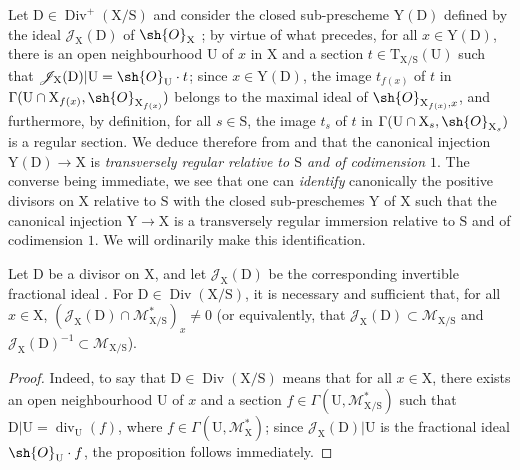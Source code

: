 \begin{env}[21.15.3.3]
\label{IV.21.15.3.3}
Let $\mathrm{D}\in\operatorname{Div}^+(\mathrm{X}/\mathrm{S})$ and consider the closed sub-prescheme $\mathrm{Y}(\mathrm{D})$ defined by the ideal $\mathscr{J}_{\mathrm{X}}(\mathrm{D})$ of $\sh{O}_{\mathrm{X}}$ ; by virtue of what precedes, for all $x\in\mathrm{Y}(\mathrm{D})$, there is an open neighbourhood $\mathrm{U}$ of $x$ in $\mathrm{X}$ and a section $t\in\mathrm{T}_{\mathrm{X}/\mathrm{S}}(\mathrm{U})$ such that $\mathscr{J}_{\mathrm{X}}(\mathrm{D})|\mathrm{U}=\sh{O}_{\mathrm{U}}\cdot t$; since $x\in\mathrm{Y}(\mathrm{D})$, the image $t_{f(x)}$ of $t$ in $\Gamma(\mathrm{U}\cap\mathrm{X}_{f(x)},\sh{O}_{\mathrm{X}_{f(x)}})$ belongs to the maximal ideal of $\sh{O}_{\mathrm{X}_{f(x)},x}$, and furthermore, by definition, for all $s\in\mathrm{S}$, the image $t_s$ of $t$ in $\Gamma(\mathrm{U}\cap\mathrm{X}_s,\sh{O}_{\mathrm{X}_s})$ is a regular section.
We deduce therefore from  and  that the canonical injection $\mathrm{Y}(\mathrm{D})\to\mathrm{X}$ is \emph{transversely regular relative to $\mathrm{S}$ and of codimension $1$}.
The converse being immediate, we see that one can \emph{identify} canonically the positive divisors on $\mathrm{X}$ relative to $\mathrm{S}$ with the closed sub-preschemes $\mathrm{Y}$ of $\mathrm{X}$ such that the canonical injection $\mathrm{Y}\to\mathrm{X}$ is a transversely regular immersion relative to $\mathrm{S}$ and of codimension $1$.
We will ordinarily make this identification.
\end{env}

\begin{proposition}[21.15.4]
\label{IV.21.15.4}
Let $\mathrm{D}$ be a divisor on $\mathrm{X}$, and let $\mathscr{J}_{\mathrm{X}}(\mathrm{D})$ be the corresponding invertible fractional ideal .
For $\mathrm{D}\in\operatorname{Div}(\mathrm{X}/\mathrm{S})$, it is necessary and sufficient that, for all $x\in\mathrm{X}$, $(\mathscr{J}_{\mathrm{X}}(\mathrm{D})\cap\mathscr{M}_{\mathrm{X}/\mathrm{S}}^*)_x\neq 0$ (or equivalently, that $\mathscr{J}_{\mathrm{X}}(\mathrm{D})\subset\mathscr{M}_{\mathrm{X}/\mathrm{S}}$ and $\mathscr{J}_{\mathrm{X}}(\mathrm{D})^{-1}\subset\mathscr{M}_{\mathrm{X}/\mathrm{S}}$).
\end{proposition}

\begin{proof}
Indeed, to say that $\mathrm{D}\in\operatorname{Div}(\mathrm{X}/\mathrm{S})$ means that for all $x\in\mathrm{X}$, there exists an open neighbourhood $\mathrm{U}$ of $x$ and a section $f\in\Gamma(\mathrm{U},\mathscr{M}_{\mathrm{X}/\mathrm{S}}^*)$ such that $\mathrm{D}|\mathrm{U}=\operatorname{div}_{\mathrm{U}}(f)$, where $f\in\Gamma(\mathrm{U},\mathscr{M}_{\mathrm{X}}^*)$; since $\mathscr{J}_{\mathrm{X}}(\mathrm{D})|\mathrm{U}$ is the fractional ideal $\sh{O}_{\mathrm{U}}\cdot f$, the proposition follows immediately.
\end{proof}

